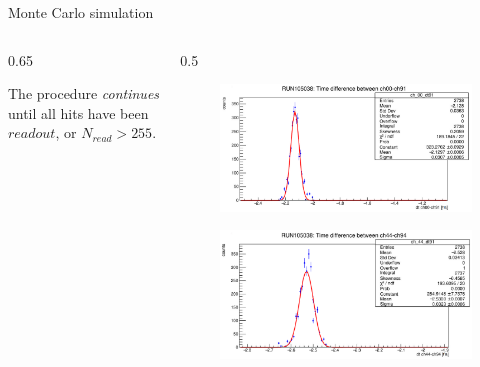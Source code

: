 \documentclass{beamer}
\begin{document}
\begin{frame}{Monte Carlo simulation}
\begin{columns}
\begin{column}{0.65\framewidth}
\begin{itemize}
{ \item The procedure \textit{continues} until all hits 
 have been $readout$, or $N_{read}>255$. }
\end{itemize}
   \end{column}
   \begin{column}{0.5\framewidth}
    \begin{figure}[H]
        \centering
    \includegraphics[width=\columnwidth]{figures/png/Screenshot from 2023-12-03 11-50-50.png}
    \label{fig:delay1}
  \end{figure}
  \begin{figure}[H]
        \centering
    \includegraphics[width=\columnwidth]{figures/png/Screenshot from 2023-12-03 11-50-33.png}

    \label{fig:delay2}
  \end{figure}
   \end{column}
  \end{columns}



    \end{frame}

    
\end{document}
